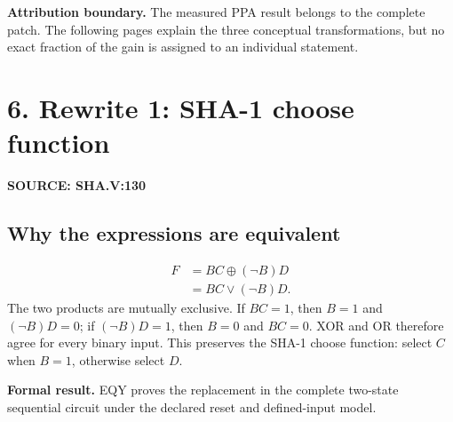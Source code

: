 \documentclass[10pt,a4paper]{article}
\newcommand{\smallcaps}[1]{\textcolor{Mid}{\fontsize{8.5}{10}\selectfont\bfseries\MakeUppercase{#1}}}
\newcommand{\newpageheading}[2]{\clearpage\section{#1}\smallcaps{#2}\vspace{6pt}}
\begin{document}


\begin{scopebox}
\textbf{Attribution boundary.} The measured PPA result belongs to the complete patch. The following pages explain the three conceptual transformations, but no exact fraction of the gain is assigned to an individual statement.
\end{scopebox}

\newpageheading{6. Rewrite 1: SHA-1 choose function}{Source: sha.v:130}

\begin{center}
\end{center}

\subsection{Why the expressions are equivalent}
\begin{align*}
F &= BC \oplus (\neg B)D \\
  &= BC \lor (\neg B)D.
\end{align*}
The two products are mutually exclusive. If $BC=1$, then $B=1$ and $(\neg B)D=0$; if $(\neg B)D=1$, then $B=0$ and $BC=0$. XOR and OR therefore agree for every binary input. This preserves the SHA-1 choose function: select $C$ when $B=1$, otherwise select $D$.

\begin{claimbox}\textbf{Formal result.} EQY proves the replacement in the complete two-state sequential circuit under the declared reset and defined-input model.\end{claimbox}
\end{document}
